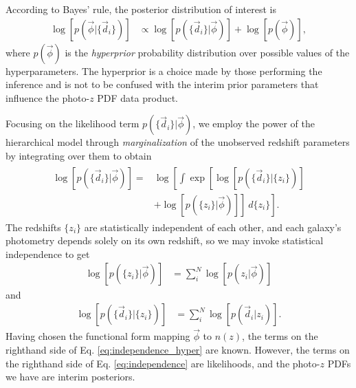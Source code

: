 \documentclass[iop]{emulateapj}
\begin{document}
According to Bayes' rule, the posterior distribution of interest is
\begin{align}
\label{eq:hyper_bayes}
\log[p(\vec{\phi} | \{\vec{d}_{i}\})] &\propto \log[p(\{\vec{d}_{i}\} | \vec{\phi})] + \log[p(\vec{\phi})] ,
\end{align}
where $p(\vec{\phi})$ is the \textit{hyperprior} probability distribution over possible values of the hyperparameters.  The hyperprior is a choice made by those performing the inference and is not to be confused with the interim prior parameters that influence the photo-$z$ PDF data product.

Focusing on the likelihood term $p(\{\vec{d}_{i}\} | \vec{\phi})$, we employ the power of the hierarchical model through \textit{marginalization} of the unobserved redshift parameters by integrating over them to obtain 
\begin{align}
\label{eq:marginalize}
\begin{split}
\log[p(\{\vec{d}_{i}\} | \vec{\phi})] = & \log\left[\int\exp\left[\log[p(\{\vec{d}_{i}\} | \{z_{i}\})]\right.\right. \\
& \left.\left.+ \log[p(\{z_{i}\} | \vec{\phi})]\right]\ d\{z_{i}\}\right] .
\end{split}
\end{align}
The redshifts $\{z_{i}\}$ are statistically independent of each other, and each galaxy's photometry depends solely on its own redshift, so we may invoke statistical independence to get
\begin{align}
\label{eq:independence_hyper}
\log[p(\{z_{i}\} | \vec{\phi})] &= \sum_{i}^{N} \log[p(z_{i} | \vec{\phi})]
\end{align}
and
\begin{align}
\label{eq:independence}
\log[p(\{\vec{d}_{i}\} | \{z_{i}\})] &= \sum_{i}^{N} \log[p(\vec{d}_{i} | z_{i})] .
\end{align}
Having chosen the functional form mapping $\vec{\phi}$ to $n(z)$, the terms on the righthand side of Eq. \ref{eq:independence_hyper} are known.  However, the terms on the righthand side of Eq. \ref{eq:independence} are likelihoods, and the photo-$z$ PDFs we have are interim posteriors.
\end{document}
